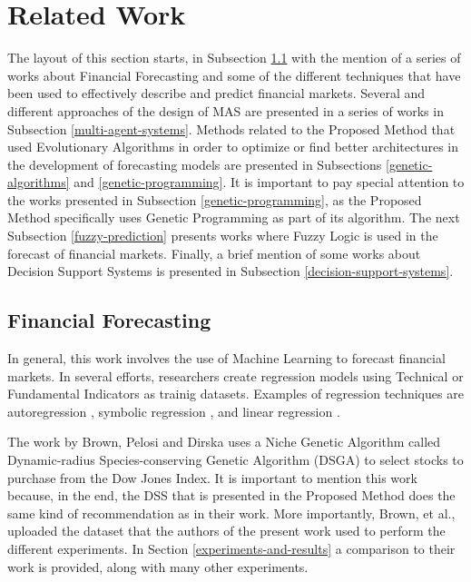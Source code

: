 \documentclass[12pt,journal,draftcls,onecolumn]{IEEEtran}
\begin{document}
\section{Related Work}
\label{related-work}

The layout of this section starts, in Subsection \ref{financial-forecasting} with the mention of a series of works about Financial Forecasting and some of the different techniques that have been used to effectively describe and predict financial markets. Several and different approaches of the design of MAS are presented in a series of works in Subsection \ref{multi-agent-systems}. Methods related to the Proposed Method that used Evolutionary Algorithms in order to optimize or find better architectures in the development of forecasting models are presented in Subsections \ref{genetic-algorithms} and \ref{genetic-programming}. It is important to pay special attention to the works presented in Subsection \ref{genetic-programming}, as the Proposed Method specifically uses Genetic Programming as part of its algorithm. The next Subsection \ref{fuzzy-prediction} presents works where Fuzzy Logic is used in the forecast of financial markets. Finally, a brief mention of some works about Decision Support Systems is presented in Subsection \ref{decision-support-systems}.

\subsection{Financial Forecasting}
\label{financial-forecasting}

In general, this work involves the use of Machine Learning to forecast
financial markets. In several efforts, researchers create regression
models using Technical or Fundamental Indicators as trainig
datasets. Examples of regression techniques are autoregression
\cite{burg1968new}, symbolic regression \cite{billard2002symbolic},
and linear regression \cite{kutner2004applied}.

The work by Brown, Pelosi and Dirska \cite{brown2013dynamic} uses a
Niche Genetic Algorithm called Dynamic-radius Species-conserving
Genetic Algorithm (DSGA) to select stocks to purchase from the Dow
Jones Index. It is important to mention this work because, in the end,
the DSS that is presented in the Proposed Method does the same kind of
recommendation as in their work. More importantly, Brown, et al.,
uploaded the dataset that the authors of the present work used to
perform the different experiments. In Section
\ref{experiments-and-results} a comparison to their work is provided,
along with many other experiments.
\end{document}
